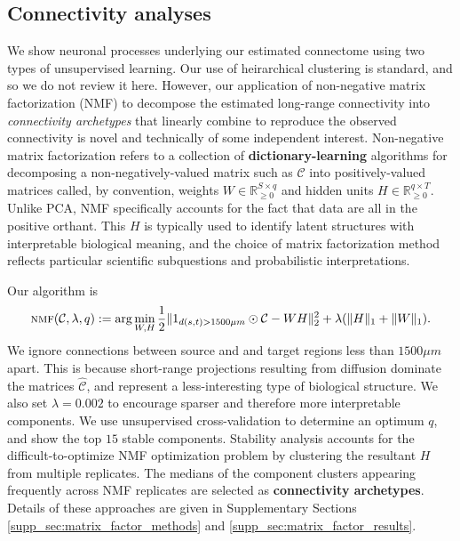 \newpage

\subsection{Connectivity analyses}

We show neuronal processes underlying our estimated connectome using two types of unsupervised learning.
Our use of heirarchical clustering is standard, and so we do not review it here.
However, our application of non-negative matrix factorization (NMF) to decompose the estimated long-range connectivity into \textit{connectivity archetypes} that linearly combine to reproduce the observed connectivity is novel and technically of some independent interest.
Non-negative matrix factorization refers to a collection of \textbf{dictionary-learning} algorithms for decomposing a non-negatively-valued matrix such as $\mathcal C $ into positively-valued matrices called, by convention, weights $W \in \mathbb R^{S \times q}_{\geq 0}$ and hidden units $H \in \mathbb R^{q  \times T}_{\geq 0}$.
Unlike PCA, NMF specifically accounts for the fact that data are all in the positive orthant.
This $H$ is typically used to identify latent structures with interpretable biological meaning, and the choice of matrix factorization method reflects particular scientific subquestions and probabilistic interpretations. 

Our algorithm is 
\begin{eqnarray*}
\label{eq:nmf}
\textsc{nmf}(\mathcal C, \lambda, q) := \arg \min_{W, H} \frac{1}{2}\| 1_{d(s,t) > 1500 \mu m} \odot \mathcal C - WH\|_2^2  + \lambda  (\|H \|_1 + \|W \|_1) .
\end{eqnarray*}
We ignore connections between source and and target regions less than $1500 \mu m$ apart.
This is because short-range projections resulting from diffusion dominate the matrices $\hat {\mathcal C}$, and represent a less-interesting type of biological structure.
We also set $\lambda = 0.002$ to encourage sparser and therefore more interpretable components.
We use unsupervised cross-validation to determine an optimum $q$, and show the top $15$ stable components.
Stability analysis accounts for the difficult-to-optimize NMF optimization problem by clustering the resultant $H$ from multiple replicates.
The medians of the component clusters appearing frequently across NMF replicates are selected as \textbf{connectivity archetypes}.
Details of these approaches are given in Supplementary Sections \ref{supp_sec:matrix_factor_methods} and \ref{supp_sec:matrix_factor_results}.



